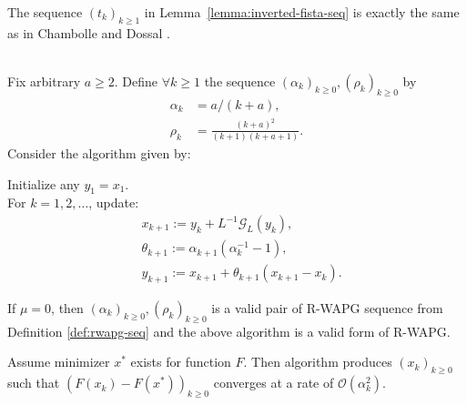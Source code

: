 \documentclass[12pt]{article}
\begin{document}
    \begin{remark}
        The sequence $(t_k)_{k\geq 1}$ in Lemma~\ref{lemma:inverted-fista-seq} is exactly the same as in Chambolle and Dossal 
        \cite[Theorem 3.1]{chambolle_convergence_2015}.
    \end{remark}
    \begin{theorem}\label{thm:r-wapg-on-cham-doss}\;\\
        Fix arbitrary $a \ge 2$.
        Define $\forall k \ge 1$ the sequence $(\alpha_k)_{k \ge 0}, (\rho_k)_{k \ge 0}$ by
        \begin{align*}
            \alpha_k &= a/(k + a),
            \\
            \rho_k &= \frac{(k + a)^2}{(k + 1)(k + a + 1)}.
        \end{align*}
        Consider the algorithm given by:
        \begin{tcolorbox}
            Initialize any $y_1 = x_1$.
            \\
            For $k = 1, 2, \ldots$, update:
            \begin{align*}
                & x_{k + 1} := y_k + L^{-1}\mathcal G_L(y_k),
                \\
                & \theta_{k + 1} := \alpha_{k + 1}(\alpha_k^{-1} - 1),
                \\
                & y_{k + 1} := x_{k + 1} + \theta_{k + 1}(x_{k + 1} - x_k).
            \end{align*}
        \end{tcolorbox}
        If $\mu = 0$, then $(\alpha_k)_{k \ge 0}, (\rho_k)_{k \ge 0}$ is a valid pair of R-WAPG sequence from Definition \ref{def:rwapg-seq} and the above algorithm is a valid form of R-WAPG.
        \par
        Assume minimizer $x^*$ exists for function $F$.
        Then algorithm produces $(x_k)_{k \ge 0}$ such that $(F(x_{k}) - F(x^*))_{k\geq 0}$ converges at a rate of $\mathcal O(\alpha_k^2)$.
    \end{theorem}
\end{document}
